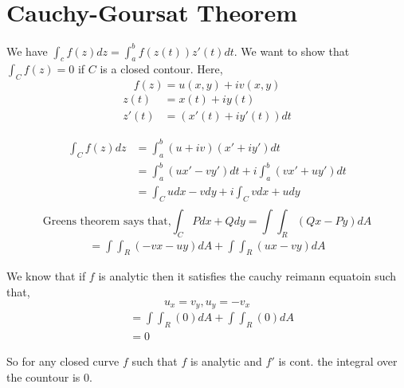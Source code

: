 \section{Cauchy-Goursat Theorem}
We have $\int_c f(z) dz = \int_a^b f(z(t)) z'(t) dt$. We want to show that  $\int_C f(z) = 0$ if $C$ is a closed contour. Here, 
$$ f(z) = u(x,y) + iv(x,y) $$  
\begin{align*}
   z(t) &= x(t) + iy(t)\\
   z'(t) &= (x'(t) + iy'(t))dt
\end{align*}


\begin{align*}
   \int_Cf(z)dz &= \int_a^b (u + iv)(x' + iy')dt\\
                &= \int_a^b (ux' - vy') dt + i\int_a^b (vx' + uy')dt\\
                &= \int_C udx - vdy + i \int_C vdx + udy\\
\end{align*}
$$\text{Greens theorem says that,} \int_C Pdx + Qdy = \int\int_R (Qx - Py)dA$$
\begin{align*}
   = \int\int_R (-vx - uy)dA + \int \int_R (ux - vy) dA
\end{align*}

We know that if $f$ is analytic then it satisfies the cauchy reimann equatoin such that, 
$$ u_x = v_y, u_y = -v_x $$ 
\begin{align*}
&= \int\int_R (0)dA + \int \int_R (0) dA\\
&= 0
\end{align*}

So for any closed curve $f$ such that $f$ is analytic and $f'$ is cont. the integral over the countour is 0.

